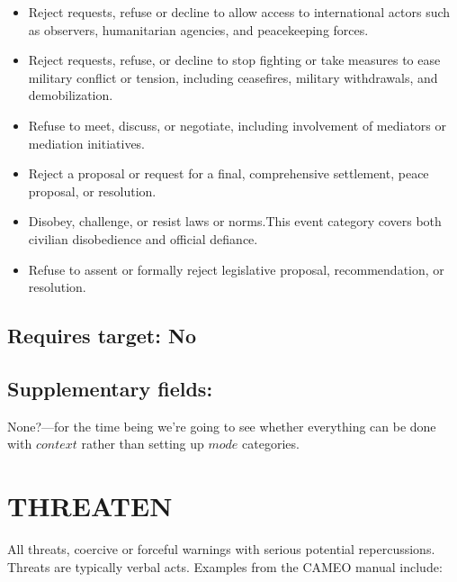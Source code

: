 \documentclass[11pt]{report}
\begin{document}
\begin{itemize}
\item Reject requests, refuse or decline to allow access to international actors such as observers, humanitarian agencies, and peacekeeping forces.
\item Reject requests, refuse, or decline to stop fighting or take measures to ease military conflict or tension, including ceasefires, military withdrawals, and demobilization.
\item Refuse to meet, discuss, or negotiate, including involvement of mediators or mediation initiatives.
\item Reject a proposal or request for a final, comprehensive settlement, peace proposal, or resolution.
\item Disobey, challenge, or resist laws or norms.This event category covers both civilian disobedience and official defiance.
\item Refuse to assent or formally reject legislative proposal, recommendation, or resolution.
\end{itemize}

\subsection{Requires target: No}

\subsection{Supplementary fields:}

None?---for the time being we're going to see whether everything can be done with $context$ rather than setting up $mode$ categories.

\newpage  


\section{THREATEN}

All threats, coercive or forceful warnings with serious potential repercussions. Threats are typically verbal acts. Examples from the CAMEO manual include:
\end{document}
